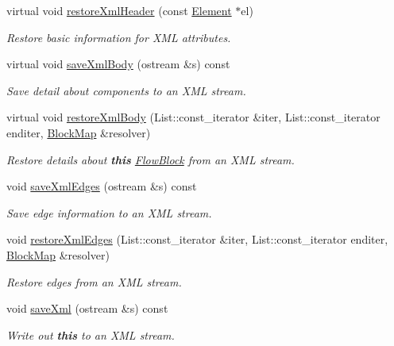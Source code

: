\begin{DoxyCompactItemize}
virtual void \mbox{\hyperlink{class_flow_block_ad41a9b871ab1994b91334de10fc2c63f}{restore\+Xml\+Header}} (const \mbox{\hyperlink{class_element}{Element}} $\ast$el)
\begin{DoxyCompactList}\small\item\em Restore basic information for X\+ML attributes. \end{DoxyCompactList}\item 
virtual void \mbox{\hyperlink{class_flow_block_a05d5939fe8f00edba7320799bf3f177b}{save\+Xml\+Body}} (ostream \&s) const
\begin{DoxyCompactList}\small\item\em Save detail about components to an X\+ML stream. \end{DoxyCompactList}\item 
virtual void \mbox{\hyperlink{class_flow_block_aea33ed5d172e8486557198c2e18c88ae}{restore\+Xml\+Body}} (List\+::const\+\_\+iterator \&iter, List\+::const\+\_\+iterator enditer, \mbox{\hyperlink{class_block_map}{Block\+Map}} \&resolver)
\begin{DoxyCompactList}\small\item\em Restore details about {\bfseries{this}} \mbox{\hyperlink{class_flow_block}{Flow\+Block}} from an X\+ML stream. \end{DoxyCompactList}\item 
void \mbox{\hyperlink{class_flow_block_a5b6c4638bc1ca5fa47c33fe2ca0e1696}{save\+Xml\+Edges}} (ostream \&s) const
\begin{DoxyCompactList}\small\item\em Save edge information to an X\+ML stream. \end{DoxyCompactList}\item 
void \mbox{\hyperlink{class_flow_block_a4f4f2a042d4754abc9facea69d7f5cd1}{restore\+Xml\+Edges}} (List\+::const\+\_\+iterator \&iter, List\+::const\+\_\+iterator enditer, \mbox{\hyperlink{class_block_map}{Block\+Map}} \&resolver)
\begin{DoxyCompactList}\small\item\em Restore edges from an X\+ML stream. \end{DoxyCompactList}\item 
void \mbox{\hyperlink{class_flow_block_a91d4573992c7a798259b34be67d97d5a}{save\+Xml}} (ostream \&s) const
\begin{DoxyCompactList}\small\item\em Write out {\bfseries{this}} to an X\+ML stream. \end{DoxyCompactList}\item 

\end{DoxyCompactItemize}
